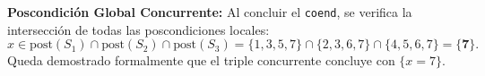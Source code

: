 \documentclass[11pt,a4paper,twoside,openright]{report}
\begin{document}
\begin{solucion}
\textbf{Poscondición Global Concurrente:}
Al concluir el \texttt{coend}, se verifica la intersección de todas las poscondiciones locales:
\[
x \in \text{post}(S_1) \cap \text{post}(S_2) \cap \text{post}(S_3) = \{1, 3, 5, 7\} \cap \{2, 3, 6, 7\} \cap \{4, 5, 6, 7\} = \mathbf{\{7\}}.
\]
Queda demostrado formalmente que el triple concurrente concluye con $\{x = 7\}$.
\end{solucion}
\end{document}

